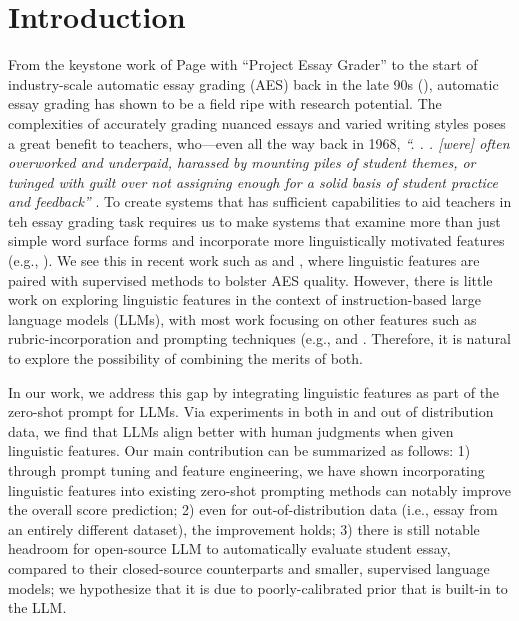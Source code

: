 \section{Introduction}
\label{introduction}
From the keystone work of Page with ``Project Essay Grader'' to the start of industry-scale automatic essay grading (AES) back in the late 90s (\cite{hearst2000}), automatic essay grading has shown to be a field ripe with research potential. The complexities of accurately grading nuanced essays and varied writing styles poses a great benefit to teachers, who---even all the way back in 1968, \textit{``. . . [were] often overworked and underpaid, harassed by mounting piles of student themes, or twinged with guilt over not assigning enough for a solid basis of student practice and feedback''} \cite{page1968}. To create systems that has sufficient capabilities to aid teachers in teh essay grading task requires us to make systems that examine more than just simple word surface forms and incorporate more linguistically motivated features (e.g., \cite{burstein1998}). We see this in recent work such as \cite{ridleyPromptAgnosticEssay2020} and \cite{uto-etal-2020-neural}, where linguistic features are paired with supervised methods to bolster AES quality. However, there is little work on exploring linguistic features in the context of instruction-based large language models (LLMs), with most work focusing on other features such as rubric-incorporation \cite{hashemi-etal-2024-llm} and prompting techniques (e.g., \cite{liu-etal-2023-g} and \cite{chiang-lee-2023-closer}. Therefore, it is natural to explore the possibility of combining the merits of both.

In our work, we address this gap by integrating linguistic features as part of the zero-shot prompt for LLMs. Via experiments in both in and out of distribution data, we find that LLMs align better with human judgments when given linguistic features. Our main contribution can be summarized as follows: 1) through prompt tuning and feature engineering, we have shown incorporating linguistic features into existing zero-shot prompting methods can notably improve the overall score prediction; 2) even for out-of-distribution data (i.e., essay from an entirely different dataset), the improvement holds; 3) there is still notable headroom for open-source LLM to automatically evaluate student essay, compared to their closed-source counterparts and smaller, supervised language models; we hypothesize that it is due to poorly-calibrated prior that is built-in to the LLM.
